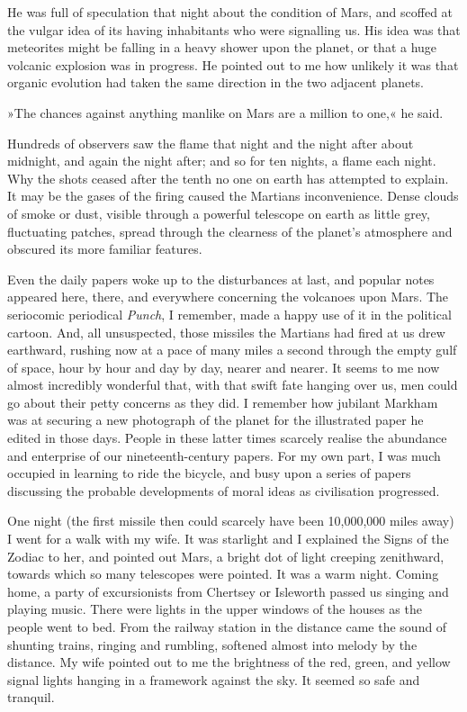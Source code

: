 He was full of speculation that night about the condition of Mars, and scoffed at the vulgar idea of its having inhabitants who were signalling us. His idea was that meteorites might be falling in a heavy shower upon the planet, or that a huge volcanic explosion was in progress. He pointed out to me how unlikely it was that organic evolution had taken the same direction in the two adjacent planets.

»The chances against anything manlike on Mars are a million to one,« he said.

Hundreds of observers saw the flame that night and the night after about midnight, and again the night after; and so for ten nights, a flame each night. Why the shots ceased after the tenth no one on earth has attempted to explain. It may be the gases of the firing caused the Martians inconvenience. Dense clouds of smoke or dust, visible through a powerful telescope on earth as little grey, fluctuating patches, spread through the clearness of the planet's atmosphere and obscured its more familiar features.

Even the daily papers woke up to the disturbances at last, and popular notes appeared here, there, and everywhere concerning the volcanoes upon Mars. The seriocomic periodical \textit{Punch}, I remember, made a happy use of it in the political cartoon. And, all unsuspected, those missiles the Martians had fired at us drew earthward, rushing now at a pace of many miles a second through the empty gulf of space, hour by hour and day by day, nearer and nearer. It seems to me now almost incredibly wonderful that, with that swift fate hanging over us, men could go about their petty concerns as they did. I remember how jubilant Markham was at securing a new photograph of the planet for the illustrated paper he edited in those days. People in these latter times scarcely realise the abundance and enterprise of our nineteenth-century papers. For my own part, I was much occupied in learning to ride the bicycle, and busy upon a series of papers discussing the probable developments of moral ideas as civilisation progressed.

One night (the first missile then could scarcely have been 10,000,000 miles away) I went for a walk with my wife. It was starlight and I explained the Signs of the Zodiac to her, and pointed out Mars, a bright dot of light creeping zenithward, towards which so many telescopes were pointed. It was a warm night. Coming home, a party of excursionists from Chertsey or Isleworth passed us singing and playing music. There were lights in the upper windows of the houses as the people went to bed. From the railway station in the distance came the sound of shunting trains, ringing and rumbling, softened almost into melody by the distance. My wife pointed out to me the brightness of the red, green, and yellow signal lights hanging in a framework against the sky. It seemed so safe and tranquil.


